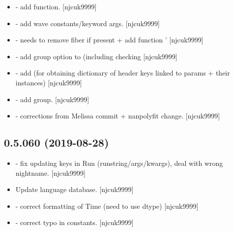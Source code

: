 \documentclass[a4paper,10pt,english]{report}
\begin{document}
\begin{itemize}
\item {} 
 - add  function.
{[}njcuk9999{]}

\item {} 
 - add wave constants/keyword args. {[}njcuk9999{]}

\item {} 
 -  needs to remove fiber
if present + add function ’ {[}njcuk9999{]}

\item {} 
 - add group option to 
(including checking  {[}njcuk9999{]}

\item {} 
 - add  (for
obtaining dictionary of header keys linked to params + their
instances) {[}njcuk9999{]}

\item {} 
 - add group. {[}njcuk9999{]}

\item {} 
 - corrections from Melissa commit + nanpolyfit
change. {[}njcuk9999{]}

\end{itemize}


\subsection{0.5.060 (2019-08-28)}
\label{\detokenize{misc/changelog:id83}}\begin{itemize}
\item {} 
 - fix updating keys in Run
(runstring/args/kwargs), deal with wrong nightname. {[}njcuk9999{]}

\item {} 
Update language database. {[}njcuk9999{]}

\item {} 
 - correct formatting of Time (need to use dtype)
{[}njcuk9999{]}

\item {} 
 - correct typo in
constants. {[}njcuk9999{]}

\end{itemize}
\end{document}
